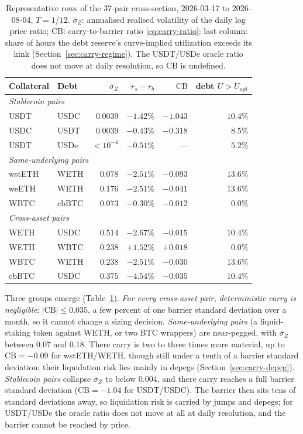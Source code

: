 \documentclass[11pt]{article}
\theoremstyle{plain}
\theoremstyle{definition}
\theoremstyle{remark}
\begin{document}
\begin{table}[ht]
\centering
\small
\begin{tabular}{llrrrr}
\toprule
Collateral & Debt & $\bar\sigma_Z$ & $r_s-r_b$ & $\mathrm{CB}$ & debt $U>U_{\mathrm{opt}}$ \\
\midrule
\multicolumn{6}{l}{\emph{Stablecoin pairs}}\\
USDT & USDC  & $0.0039$ & $-1.42\%$ & $-1.043$ & $10.4\%$ \\
USDC & USDT  & $0.0039$ & $-0.43\%$ & $-0.318$ & $8.5\%$ \\
USDT & USDe  & ${<}10^{-4}$ & $-0.51\%$ & --- & $5.2\%$ \\
\midrule
\multicolumn{6}{l}{\emph{Same-underlying pairs}}\\
wstETH & WETH & $0.078$ & $-2.51\%$ & $-0.093$ & $13.6\%$ \\
weETH & WETH  & $0.176$ & $-2.51\%$ & $-0.041$ & $13.6\%$ \\
WBTC & cbBTC  & $0.073$ & $-0.30\%$ & $-0.012$ & $0.0\%$ \\
\midrule
\multicolumn{6}{l}{\emph{Cross-asset pairs}}\\
WETH & USDC  & $0.514$ & $-2.67\%$ & $-0.015$ & $10.4\%$ \\
WETH & WBTC  & $0.238$ & $+1.52\%$ & $+0.018$ & $0.0\%$ \\
WBTC & WETH  & $0.238$ & $-2.51\%$ & $-0.030$ & $13.6\%$ \\
cbBTC & USDC & $0.375$ & $-4.54\%$ & $-0.035$ & $10.4\%$ \\
\bottomrule
\end{tabular}
\caption{Representative rows of the $37$-pair cross-section, 2026-03-17 to 2026-08-04, $T=1/12$.
$\bar\sigma_Z$: annualised realised volatility of the daily log price ratio; $\mathrm{CB}$:
carry-to-barrier ratio \eqref{eq:carry-ratio}; last column: share of hours the debt reserve's
curve-implied utilization exceeds its kink (Section~\ref{sec:carry-regime}). The USDT/USDe oracle
ratio does not move at daily resolution, so $\mathrm{CB}$ is undefined.}
\label{tab:carry-xs}
\end{table}

Three groups emerge (Table~\ref{tab:carry-xs}). \emph{For every cross-asset pair, deterministic
carry is negligible}: $|\mathrm{CB}|\le0.035$, a few percent of one barrier standard deviation over
a month, so it cannot change a sizing decision. \emph{Same-underlying pairs} (a liquid-staking token
against WETH, or two BTC wrappers) are near-pegged, with $\bar\sigma_Z$ between $0.07$ and $0.18$.
There carry is two to three times more material, up to $\mathrm{CB}=-0.09$ for wstETH/WETH, though
still under a tenth of a barrier standard deviation; their liquidation risk lies mainly in depegs
(Section~\ref{sec:carry-depeg}). \emph{Stablecoin pairs} collapse $\bar\sigma_Z$ to below $0.004$, and
there carry reaches a full barrier standard deviation ($\mathrm{CB}=-1.04$ for USDT/USDC). The
barrier then sits tens of standard deviations away, so liquidation risk is carried by jumps and
depegs; for USDT/USDe the oracle ratio does not move at all at daily resolution, and the barrier
cannot be reached by price.
\end{document}
